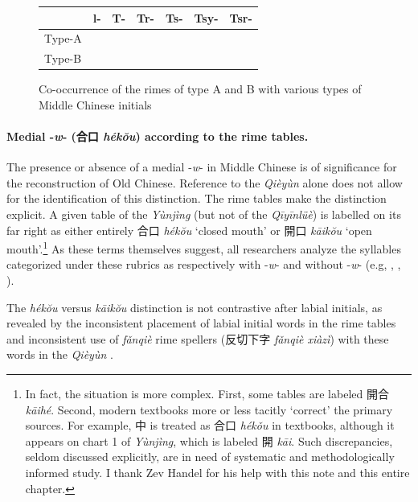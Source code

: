\begin{figure}
    \centering
\begin{tabular}{|l|l|l|l|l|l|l|}
\hline
     &  l- & T- & Tr- & Ts- & Tsy- & Tsr- \\
\hline
Type-A & {\sil{✓}} & {\sil{✓}} & {\sil{✓}} & {\sil{✓}} && {\sil{✓}} \\
\hline
Type-B & {\sil{✓}} & & {\sil{✓}} & & {\sil{✓}} &  {\sil{✓}} \\
\hline
\end{tabular}
    \caption{Co-occurrence of the rimes of type A and B with various types of Middle Chinese initials}
    \label{fig:co-occurence-of-A-and-B}
\end{figure}


\paragraph{Medial -\emph{w}- (合口
 \emph{hékŏu}) according to the rime tables.}
The presence or absence of a medial -\emph{w}- in Middle Chinese is of
significance for the reconstruction of Old Chinese. Reference to the
 \emph{Qièyùn} alone does not allow for the identification of this
distinction. The rime tables make the distinction explicit. A given
table of the  \emph{Yùnjìng} (but not of the  \emph{Qīyīnlüè}) is labelled
on its far right as either entirely 合口  \emph{hékŏu} `closed mouth' or
開口 \emph{kāikŏu} `open mouth'.\footnote{In fact, the situation is more
  complex. First, some tables are labeled 開合  \emph{kāihé}. Second,
  modern textbooks more or less tacitly `correct' the primary sources.
  For example, 中 is treated as 合口  \emph{hékǒu} in textbooks, although
  it appears on chart 1 of  \emph{Yùnjìng}, which is labeled 開
   \emph{kāi}. Such discrepancies, seldom discussed explicitly, are in
  need of systematic and methodologically informed study. I thank Zev
  Handel for his help with this note and this entire chapter.} As these
terms themselves suggest, all re­searchers analyze the syllables
categorized under these rubrics as respectively with -\emph{w}- and
without -\emph{w}- (e.g, 
\cite[62]{Baxter1992},
\cite[9]{Schuessler2009minimal},
\cite[2013-204]{Baxter2014OldChinese}).

The \emph{hékŏu }versus \emph{kāikŏu} distinction is not contrastive
after labial initials, as revealed by the inconsistent placement of
labial initial words in the rime tables and inconsistent use of
 \emph{fǎnqiè} rime spellers (反切下字  \emph{fǎnqiè xiàzì}) with these
words in the \emph{Qièyùn}
\citep[62-63]{Baxter1992}.


